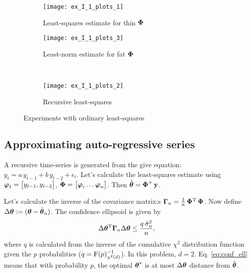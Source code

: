 \begin{figure}[H]
	\centering
	\begin{subfigure}[b]{.43\textwidth}
		\centering
		\texttt{[image: ex\_I\_1\_plots\_1]}
		\caption{Least-squares estimate for thin $\boldsymbol{\mathrm{\Phi}}$}
		\label{fig:ex_I_1_plots_1}
	\end{subfigure}\hfill
	\begin{subfigure}[b]{.43\textwidth}
		\centering
		\texttt{[image: ex\_I\_1\_plots\_3]}
		\caption{Least-norm estimate for fat $\boldsymbol{\mathrm{\Phi}}$}
		\label{fig:ex_I_1_plots_3}
	\end{subfigure}\\
	\begin{subfigure}[b]{.45\textwidth}
		\centering
		\vspace{6mm}
		\texttt{[image: ex\_I\_1\_plots\_2]}
		\caption{Recursive least-squares}
		\label{fig:ex_I_1_plots_2}
	\end{subfigure}
	\caption{Experiments with ordinary least-squares}
\end{figure}


\subsection{Approximating auto-regressive series}

A recursive time-series is generated from the give equation: $y_t = a\,y_{t-1} + b\,y_{t-2} + \epsilon_t$.
Let's calculate the least-squares estimate using $\boldsymbol{\mathrm{\varphi}}_t = \begin{bmatrix}y_{t-1}, y_{t-2}\end{bmatrix}$,
$\v{\Phi}=\mat{\v{\varphi}_i\dots\v{\varphi}_n}$.
Then $\hat{\boldsymbol{\mathrm{\theta}}} = \boldsymbol{\mathrm{\Phi}}^+\,\boldsymbol{\mathrm{y}}$.


Let's calculate the inverse of the covariance matrix:s
$\boldsymbol{\mathrm{\Gamma}}_n = \frac{1}{n}\,\boldsymbol{\mathrm{\Phi}}\textsuperscript{T}\,\boldsymbol{\mathrm{\Phi}}$.
Now define $\Delta\boldsymbol{\mathrm{\theta}} := (\boldsymbol{\mathrm{\theta}} - \hat{\boldsymbol{\mathrm{\theta}}}_n)$.
The confidence ellipsoid is given by 
\begin{equation}\label{eq:conf_ell}
	\Delta\boldsymbol{\mathrm{\theta}}\textsuperscript{T}\boldsymbol{\mathrm{\Gamma}}_n\Delta\boldsymbol{\mathrm{\theta}}\leq\frac{q\,\hat{\sigma}_n^2}{n},
\end{equation}
where $q$ is calculated from the inverse of the cumulative $\chi^2$ distribution function
given the $p$ probabilities ($q = \mathrm{F}(p)_{\chi^2(d)}^{-1}$).
In this problem, $d=2$.
Eq. \ref{eq:conf_ell} means that with probability $p$, the optimal $\boldsymbol{\mathrm{\theta}}^*$
is at most $\Delta\boldsymbol{\mathrm{\theta}}$ distance from $\hat{\boldsymbol{\mathrm{\theta}}}$.

